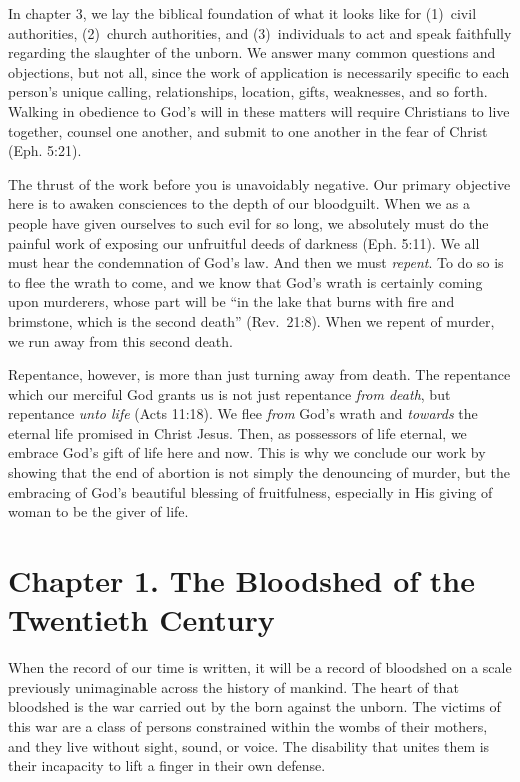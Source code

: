 \documentclass[
]{book}
\begin{document}
In chapter 3, we lay the biblical foundation of what it looks like for (1)~civil authorities, (2)~church authorities, and (3)~individuals to act and speak faithfully regarding the slaughter of the unborn. We answer many common questions and objections, but not all, since the work of application is necessarily specific to each person's unique calling, relationships, location, gifts, weaknesses, and so forth. Walking in obedience to God's will in these matters will require Christians to live together, counsel one another, and submit to one another in the fear of Christ (Eph. 5:21).

The thrust of the work before you is unavoidably negative. Our primary objective here is to awaken consciences to the depth of our bloodguilt. When we as a people have given ourselves to such evil for so long, we absolutely must do the painful work of exposing our unfruitful deeds of darkness (Eph. 5:11). We all must hear the condemnation of God's law. And then we must \emph{repent}. To do so is to flee the wrath to come, and we know that God's wrath is certainly coming upon murderers, whose part will be ``in the lake that burns with fire and brimstone, which is the second death'' (Rev.~21:8). When we repent of murder, we run away from this second death.

Repentance, however, is more than just turning away from death. The repentance which our merciful God grants us is not just repentance \emph{from death}, but repentance \emph{unto life} (Acts 11:18). We flee \emph{from} God's wrath and \emph{towards} the eternal life promised in Christ Jesus. Then, as possessors of life eternal, we embrace God's gift of life here and now. This is why we conclude our work by showing that the end of abortion is not simply the denouncing of murder, but the embracing of God's beautiful blessing of fruitfulness, especially in His giving of woman to be the giver of life.

\hypertarget{chapter-1.-the-bloodshed-of-the-twentieth-century}{%
\chapter{Chapter 1. The Bloodshed of the Twentieth Century}\label{chapter-1.-the-bloodshed-of-the-twentieth-century}}

When the record of our time is written, it will be a record of bloodshed on a scale previously unimaginable across the history of mankind. The heart of that bloodshed is the war carried out by the born against the unborn. The victims of this war are a class of persons constrained within the wombs of their mothers, and they live without sight, sound, or voice. The disability that unites them is their incapacity to lift a finger in their own defense.
\end{document}
